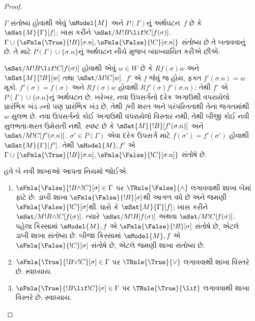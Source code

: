 \begin{proof}
\begin{enumerate}
  $\Gamma$ સંતોષ્ય હોવાથી એવું
  $\mModel{M}$ અને $P(\Gamma)$નું અર્થઘટન~$f$
  છે કે $\mSat{M}{\Gamma}[f]$; ખાસ કરીને
  $\mSat/{M}{!B \lif !C}[f(\sigma)]$.
  $\Gamma \cup \{\sFmla{\True}{!B}[\sigma.n],
  \sFmla{\False}{!C}[\sigma.n]\}$ સંતોષ્ય છે
  તે બતાવવાનું છે. તે માટે $P(\Gamma)
  \cup \{\sigma.n\}$નું અર્થઘટન નીચે મુજબ
  વ્યાખ્યાયિત કરીએ છીએ:

  $\mSat/{M}{!B \lif !C}[f(\sigma)]$
  હોવાથી એવું $w \in W$ છે કે $Rf(\sigma)w$
  અને $\mSat{M}{!B}[w]$ તથા
  $\mSat/{M}{!C}[w]$. $f'$ એ $f$ જેવું જ હોય,
  ફક્ત $f'(\sigma.n) = w$ મૂકો.
  $f'(\sigma) = f(\sigma)$ અને $Rf(\sigma)w$
  હોવાથી $Rf'(\sigma)f'(\sigma.n)$; તેથી
  $f'$ એ $P(\Gamma) \cup \{\sigma.n\}$નું
  અર્થઘટન છે. ખરેખર, નવા ઉપસર્ગનો દરેક અગાઉથી
  વપરાયેલો પ્રારંભિક ખંડ $\sigma$નો પણ પ્રારંભિક
  ખંડ છે, તેથી $f$ની શરત અને પરંપરિતતાથી તેના
  જગતમાંથી $w$ સુલભ છે. નવા ઉપસર્ગનો કોઈ અગાઉથી
  વપરાયેલો વિસ્તાર નથી; તેથી બીજી કોઈ નવી
  સુલભતા-શરત ઉમેરાતી નથી. સ્પષ્ટ છે કે
  $\mSat{M}{!B}[f'(\sigma.n)]$ અને
  $\mSat/{M}{!C}[f'(\sigma.n)]$.
  $\sigma' \in P(\Gamma)$ એવા દરેક ઉપસર્ગ માટે
  $f(\sigma') = f'(\sigma')$ હોવાથી
  $\mSat{M}{\Gamma}[f']$. તેથી $\mModel{M}, f'$
  એ $\Gamma \cup \{\sFmla{\True}{!B}[\sigma.n],
  \sFmla{\False}{!C}[\sigma.n]\}$ સંતોષે છે.
\end{enumerate}
હવે બે નવી શાખાઓ આપતા નિયમો જોઈએ.
\begin{enumerate}
\item $\sFmla{\False}{!B \land !C}[\sigma] \in \Gamma$
  પર $\TRule{\False}{\land}$ લગાવવાથી
  શાખા બેમાં ફાટે છે: ડાબી શાખા
  $\sFmla{\False}{!B}[\sigma]$થી આગળ વધે છે
  અને જમણી $\sFmla{\False}{!C}[\sigma]$થી.
  ધારો કે $\mSat{M}{\Gamma}[f]$; ખાસ કરીને
  $\mSat/{M}{!B \land !C}[f(\sigma)]$.
  ત્યારે $\mSat/{M}{!B}[f(\sigma)]$ અથવા
  $\mSat/{M}{!C}[f(\sigma)]$. પહેલા કિસ્સામાં
  $\mModel{M}, f$ એ $\sFmla{\False}{!B}[\sigma]$
  સંતોષે છે, એટલે ડાબી શાખા સંતોષ્ય છે.
  બીજા કિસ્સામાં $\mModel{M}, f$ એ
  $\sFmla{\False}{!C}[\sigma]$ સંતોષે છે,
  એટલે જમણી શાખા સંતોષ્ય છે.
\item $\sFmla{\True}{!B \lor !C}[\sigma] \in \Gamma$
  પર $\TRule{\True}{\lor}$ લગાવવાથી શાખા
  વિસ્તરે છે: સ્વાધ્યાય.
\item $\sFmla{\True}{!B \lif !C}[\sigma] \in \Gamma$
  પર $\TRule{\True}{\lif}$ લગાવવાથી શાખા
  વિસ્તરે છે: સ્વાધ્યાય.
\end{enumerate}
\end{proof}

